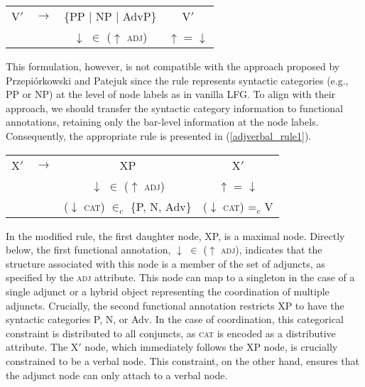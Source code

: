 \pex

\vspace{-13pt}

\label{adjverbal_rule0}
\begin{tabular}{lccc}
	V$'$ & $\longrightarrow$ & \{PP | NP | AdvP\} & V$'$ \\
	& & $\downarrow$ $\in$ ($\uparrow$ \textsc{adj}) & $\uparrow$ = $\downarrow$
	
\end{tabular}
\xe

\begin{sloppypar}
This formulation, however, is not compatible with the approach proposed by Przepiórkowski and Patejuk since the rule represents syntactic categories (e.g., PP or NP) at the level of node labels as in vanilla LFG. To align with their approach, we should transfer the syntactic category information to functional annotations, retaining only the bar-level information at the node labels. Consequently, the appropriate rule is presented in (\ref{adjverbal_rule1}).
\end{sloppypar}

\pex

\vspace{-13pt}

\label{adjverbal_rule1}
\begin{tabular}{lccc}
	X$'$ & $\longrightarrow$ & XP & X$'$ \\
	& & $\downarrow$ $\in$ ($\uparrow$ \textsc{adj}) & $\uparrow$ = $\downarrow$ \\
	&			   & ($\downarrow$ \textsc{cat}) $\in_{c}$ \{P, N, Adv\} & ($\downarrow$ \textsc{cat}) =$_{c}$ V  
\end{tabular}
\xe

In the modified rule, the first daughter node, XP, is a maximal node. Directly below, the first functional annotation, $\downarrow$ $\in$ ($\uparrow$ \textsc{adj}), indicates that the structure associated with this node is a member of the set of adjuncts, as specified by the \textsc{adj} attribute. This node can map to a singleton in the case of a single adjunct or a hybrid object representing the coordination of multiple adjuncts. Crucially, the second functional annotation restricts XP to have the syntactic categories P, N, or Adv. In the case of coordination, this categorical constraint is distributed to all conjuncts, as \textsc{cat} is encoded as a distributive attribute. The X$'$ node, which immediately follows the XP node, is crucially constrained to be a verbal node. This constraint, on the other hand, ensures that the adjunct node can only attach to a verbal node. 

